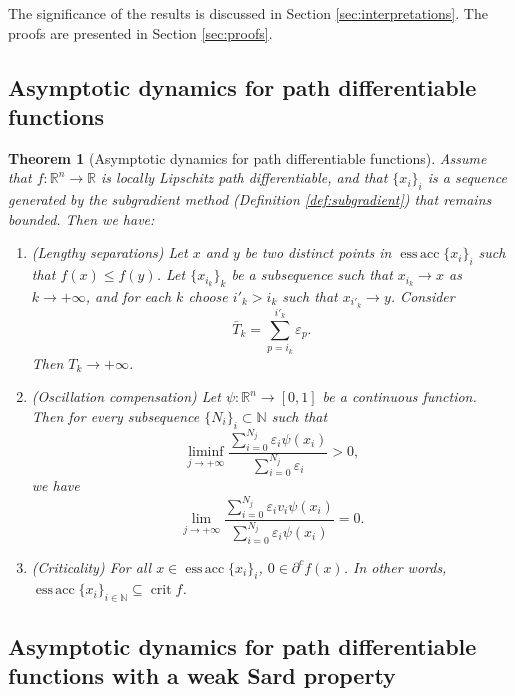 \documentclass[11pt]{article}
\newtheorem{thm}{Theorem}
\theoremstyle{definition}
\theoremstyle{remark}
\DeclareMathOperator{\crit}{crit}
\DeclareMathOperator{\essacc}{ess\,acc}
\newcommand{\R}{\mathbb{R}}
\newcommand{\N}{\mathbb{N}}
\renewcommand{\leq}{\leqslant}
\begin{document}
The significance of the results is discussed in Section \ref{sec:interpretations}. The proofs are presented in Section \ref{sec:proofs}.
%

%

%

%
%
%
 
%
%

%

\subsection{Asymptotic dynamics for path differentiable functions}
\label{sec:pathdiff}


\begin{thm}[Asymptotic dynamics for path differentiable functions]\label{thm:main}
 Assume that $f\colon\R^n\to\R$ is locally Lipschitz path differentiable, and that $\{x_i\}_i$ is a sequence generated by the subgradient method (Definition \ref{def:subgradient}) that remains bounded. Then we have:
 \begin{enumerate}[label=\roman*.,ref=(\roman*)]
  \item\label{ma:longloops} (Lengthy separations) 
   Let $x$ and $y$ be two distinct points in $\essacc\{x_i\}_i$ such that $f(x)\leq f(y)$. Let $\{x_{i_k}\}_k$ be a subsequence such that $x_{i_k}\to x$ as $k\to+\infty$, and for each $k$ choose $i'_k>i_k$ such that $x_{i'_k}\to y$. Consider
   \[\bar T_k=\sum_{p=i_k}^{i'_k}\varepsilon_p.\]
   Then $T_k\to+\infty$. 
%
%
%
%
%
%
 
  \item\label{ma:oscillationcompcont} (Oscillation compensation) Let $\psi\colon\R^n\to[0,1]$ be a continuous function. Then for every subsequence $\{N_i\}_i\subset\N$ such that \[\liminf_{j\to+\infty}\frac{\displaystyle \sum_{i=0}^{N_j}\varepsilon_i\psi(x_i)}{\displaystyle\sum_{i=0}^{N_j}\varepsilon_i}>0,\]
  we have
  \[\lim_{j\to+\infty}\frac{\displaystyle\sum_{i=0}^{N_j}\varepsilon_iv_i\psi(x_i)}{\displaystyle\sum_{i=0}^{N_j}\varepsilon_i\psi(x_i)}=0.\]
  

  \item\label{ma:criticality} (Criticality) For all $x\in\essacc\{x_i\}_i$, $0\in\partial^cf(x)$. In other words, $\essacc\{x_i\}_{i\in\N}\subseteq\crit f$.
 \end{enumerate}
\end{thm}

\subsection{Asymptotic dynamics for path differentiable functions with a weak Sard pro\-perty}
\label{sec:pathdiffsard}
\end{document}
